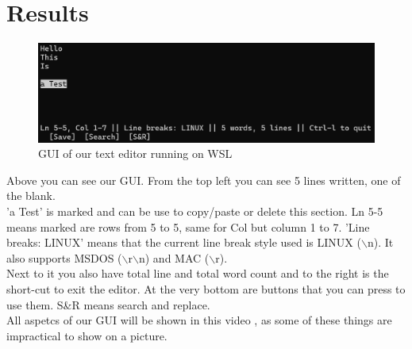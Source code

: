 \section{Results}\label{sec:results}
\begin{figure}[h]
    \centering
    \includegraphics[width=1.0\linewidth]{figures/results_terminal.png}
    \caption{GUI of our text editor running on WSL}
    \label{fig:GUIterminal}            
\end{figure}
\noindent
Above you can see our GUI. From the top left you can see 5 lines written, one of the blank.
\\'a Test' is marked and can be use to copy/paste or delete this section.
Ln 5-5 means marked are rows from 5 to 5, same for Col but column 1 to 7.
'Line breaks: LINUX' means that the current line break style used is LINUX ($\backslash$n). It also supports MSDOS ($\backslash$r$\backslash$n) and MAC ($\backslash$r).
\\Next to it you also have total line and total word count and to the right is the short-cut to exit the editor.
At the very bottom are buttons that you can press to use them. S\&R means search and replace.
\\All aspetcs of our GUI will be shown in this video \cite{demo}, as some of these things are impractical to show on a picture.